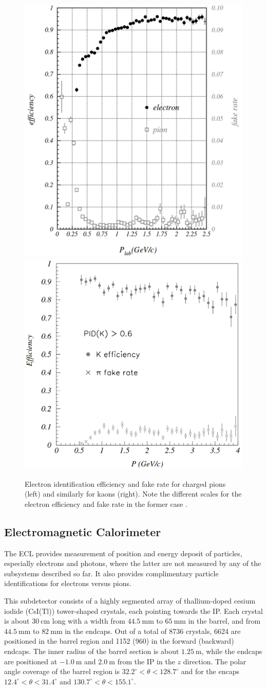 \documentclass[headings=standardclasses,headings=big,oneside,a4paper,openany,12pt]{scrbook}
\newcommand {\e}[1]{\mathrm{~#1}}
\begin{document}
\begin{figure}[H]
	\centering
	\captionsetup{width=0.8\linewidth}
	\includegraphics[width=0.48\linewidth]{fig/setup/ACC_eff1}
	\includegraphics[width=0.48\linewidth]{fig/setup/ACC_eff2}
	\caption{Electron identification efficiency and fake rate for charged pions (left) and similarly for kaons (right). Note the different scales for the electron efficiency and fake rate in the former case \cite{ABASHIAN2002117}.}
	\label{fig:ACC_eff}
\end{figure}


\subsection{Electromagnetic Calorimeter}
The ECL provides measurement of position and energy deposit of particles, especially electrons and photons, where the latter are not measured by any of the subsystems described so far. It also provides complimentary particle identifications for electrons versus pions.

This subdetector consists of a highly segmented array of thallium-doped cesium iodide (CsI(Tl)) tower-shaped crystals, each pointing towards the IP. Each crystal is about $30\e{cm}$ long with a width from $44.5\e{mm}$ to $65\e{mm}$ in the barrel, and from $44.5\e{mm}$ to $82\e{mm}$ in the endcaps. Out of a total of 8736 crystals, 6624 are positioned in the barrel region and 1152 (960) in the forward (backward) endcaps. The inner radius of the barrel section is about $1.25\e{m}$, while the endcaps are positioned at $-1.0\e{m}$ and $2.0\e{m}$ from the IP in the $z$ direction. The polar angle coverage of the barrel region is $32.2^\circ < \theta < 128.7^\circ$ and for the encaps $12.4^\circ < \theta < 31.4^\circ$ and $130.7^\circ < \theta < 155.1^\circ$.
\end{document}
